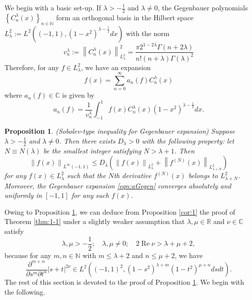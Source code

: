 \documentclass[12pt]{article}
\newcommand{\myabs}[1]{\left|#1\right|}
\newcommand{\N}{\mathbb{N}}
\newcommand{\C}{\mathbb{C}}
\newcommand{\R}{\mathbb{R}}
\renewcommand{\Re}{\operatorname{Re}}
\numberwithin{equation}{section}
\newcommand{\mynorm}[1]{\left\|#1\right\|}
\newcommand{\assign}{:=}
\newtheorem{proposition}[corollary]{Proposition}
{\theorembodyfont{\rmfamily}\newtheorem{remark}[corollary]{Remark}}
\newcommand{\mygrammarfootnote}[1]{}
\begin{document}
We begin with a basic {set-up}.
If $\lambda>-\frac{1}{2}$ and $\lambda\neq0$, the Gegenbauer polynomials $\left\{ C_n^\lambda(x) \right\}_{n\in\N}$
form an orthogonal basis in the Hilbert space $L_\lambda^2:=L^2\left( (-1,1),(1-x^2)^{\lambda-\frac{1}{2}}dx \right)$
with the norm\begin{equation}
	\label{eqn:vnlmd}
	v_n^\lambda\assign\left\|C_n^\lambda(x)\right\|^2_{L^2_\lambda}=\frac{\pi2^{1-2\lambda}\Gamma(n+2\lambda)}{n!(n+\lambda)\Gamma(\lambda)^2}
\end{equation}Therefore, for any $f\in L_\lambda^2$, we have an expansion\begin{equation}
	\label{eqn:aGegen}
	f(x)=\displaystyle\sum_{n=0}^\infty a_n(f)C_n^\lambda(x)
\end{equation}where $a_n(f)\in\C$ is\mygrammarfootnote{are?} given by
\begin{equation*}
	a_n(f)=\frac{1}{v_n^\lambda}\displaystyle\int_{-1}^1f(x)C_n^\lambda(x)(1-x^2)^{\lambda-\frac{1}{2}}dx.
\end{equation*}
\begin{proposition}
	\label{prop:1718105}(Sobolev-type inequality for Gegenbauer expansion)
	Suppose $\lambda>-\frac{1}{2}$ and $\lambda\neq0$. Then there exists $D_\lambda>0$ with the following property:
	let $N\equiv N(\lambda)$ be the smallest integer satisfying $N>\lambda+1$. Then
	\begin{equation*}
		\mynorm{f(x)}_{L^\infty(-1,1)}\le D_\lambda\left( \mynorm{f(x)}_{L^2_\lambda}+\mynorm{f^{(N)}(x)}_{L^2_{\lambda+N}} \right)	
	\end{equation*}
	for any $f(x)\in L_\lambda^2$ such that the $N$th derivative $f^{(N)}(x)$ belongs to $L^2_{\lambda+N}$. Moreover, the Gegenbauer expansion
	\eqref{eqn:aGegen} converges absolutely and uniformly in $[-1,1]$ for any such $f(x)$.
\end{proposition}
Owing to Proposition \ref{prop:1718105}, we can deduce from Proposition \ref{cor:1}
the proof of Theorem \ref{thm:1-1} under a slightly weaker assumption that $\lambda,\mu\in\R$ and $\nu\in\C$ satisfy\begin{equation*}
	\lambda,\mu>-\frac{1}{2};\quad\lambda,\mu\neq0;\quad2\Re \nu>\lambda+\mu+2,
\end{equation*}because for any $m,n\in\N$ with $m\le\lambda+2$ and $n\le\mu+2$, we have\begin{equation*}
	\frac{\partial^{m+n}}{\partial s^m\partial t^n}\myabs{s+t}^{2\nu}\in L^2\left( (-1,1)^2,(1-s^2)^{\lambda+m}(1-t^2)^{\mu+n}dsdt \right).
\end{equation*}The rest of this section is devoted to the proof of Proposition \ref{prop:1718105}. We begin with the following.
\end{document}
